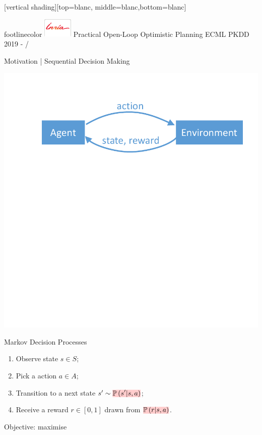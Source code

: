 \documentclass{beamer}
\begin{document}
[vertical shading][top=blanc, middle=blanc,bottom=blanc]
{
\begin{beamercolorbox}[wd=1\paperwidth,ht=15.5pt]{footlinecolor}
		\hspace{3mm}
		\includegraphics[width=14mm]{inria/logobastrans}
		\hspace{.4cm}
		\raisebox{3.2ex}
		{\scriptsize Practical Open-Loop Optimistic Planning}\hfill
		\raisebox{3.2ex}
		{ECML PKDD 2019 - \insertframenumber/\inserttotalframenumber \hspace{5mm}
			\null }
\end{beamercolorbox}
}

\begin{frame}{Motivation | Sequential Decision Making}
\begin{center}
    \includegraphics[trim=0 275 0 25,clip, width=0.75\linewidth]{img/diagram1.pdf}
\end{center}

\begin{block}{Markov Decision Processes}
\pause
\begin{enumerate}
    \item Observe state $s\in S$;\pause
    \item Pick a  action $a\in A$;\pause
    \item Transition to a next state $s'\sim \hler{\probability{s'|s,a}}$;\pause
    \item Receive a  reward $r\in[0, 1]$ drawn from $\hler{\probability{r|s, a}}$.\pause
\end{enumerate}
\begin{center}
    Objective: maximise 
\end{center}
\end{block}
\end{frame}
\end{document}
